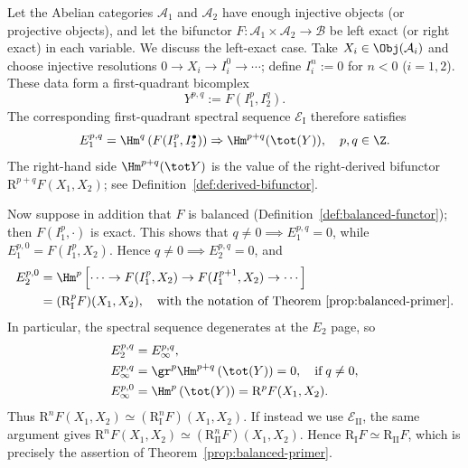 \begin{example}\label{eg:bifunctor-ss}
	Let the Abelian categories $\mathcal{A}_1$ and $\mathcal{A}_2$ have enough
	injective objects (or projective objects), and let the bifunctor
	$F:\mathcal{A}_1\times\mathcal{A}_2\to\mathcal{B}$ be left exact (or right
	exact) in each variable. We discuss the left-exact case. Take
	$X_i\in\Obj(\mathcal{A}_i)$ and choose injective resolutions
	$0\to X_i\to I_i^0\to\cdots$; define $I_i^n:=0$ for $n<0$
	($i=1,2$). These data form a first-quadrant bicomplex
	\[ Y^{p, q} := F\left( I_1^p, I_2^q \right). \]
	The corresponding first-quadrant spectral sequence
	$\mathscr{E}_{\mathrm{I}}$ therefore satisfies
	\[ E_1^{p,q} = \Hm^q\left( F(I_1^p, I_2^\bullet) \right) \Rightarrow \Hm^{p+q}(\tot(Y)), \quad p,q \in \Z. \]
	The right-hand side $\Hm^{p+q}(\tot Y)$ is the value of the right-derived
	bifunctor $\mathrm{R}^{p+q}F(X_1,X_2)$; see
	Definition~\ref{def:derived-bifunctor}.

	Now suppose in addition that $F$ is balanced
	(Definition~\ref{def:balanced-functor}); then $F(I_1^p,\cdot)$ is exact.
	This shows that $q\neq0\implies E_1^{p,q}=0$, while
	$E_1^{p,0}=F(I_1^p,X_2)$. Hence $q\neq0\implies E_2^{p,q}=0$, and
	\begin{align*}
		E_2^{p,0} & = \Hm^p\left[ \cdots \to F(I_1^p, X_2) \to F(I_1^{p+1}, X_2) \to \cdots \right] \\
		& = (\mathrm{R}_{\mathrm{I}}^p F)(X_1, X_2), \quad \text{with the notation of Theorem~\ref{prop:balanced-primer}}.
	\end{align*}
	In particular, the spectral sequence degenerates at the $E_2$ page, so
	\begin{align*}
		E_2^{p,q} & = E_\infty^{p,q}, \\
		E_\infty^{p,q} & = \gr^p \Hm^{p+q}\left(\tot(Y)\right) = 0, \quad \text{if}\; q \neq 0, \\
		E_\infty^{p,0} & = \Hm^p\left(\tot(Y)\right) = \mathrm{R}^p F(X_1, X_2) .
	\end{align*}
	Thus
	$\mathrm{R}^nF(X_1,X_2)\simeq
	(\mathrm{R}_{\mathrm{I}}^nF)(X_1,X_2)$. If instead we use
	$\mathscr{E}_{\mathrm{II}}$, the same argument gives
	$\mathrm{R}^nF(X_1,X_2)\simeq
	(\mathrm{R}_{\mathrm{II}}^nF)(X_1,X_2)$. Hence
	$\mathrm{R}_{\mathrm{I}}F\simeq\mathrm{R}_{\mathrm{II}}F$, which is
	precisely the assertion of Theorem~\ref{prop:balanced-primer}.
\end{example}

